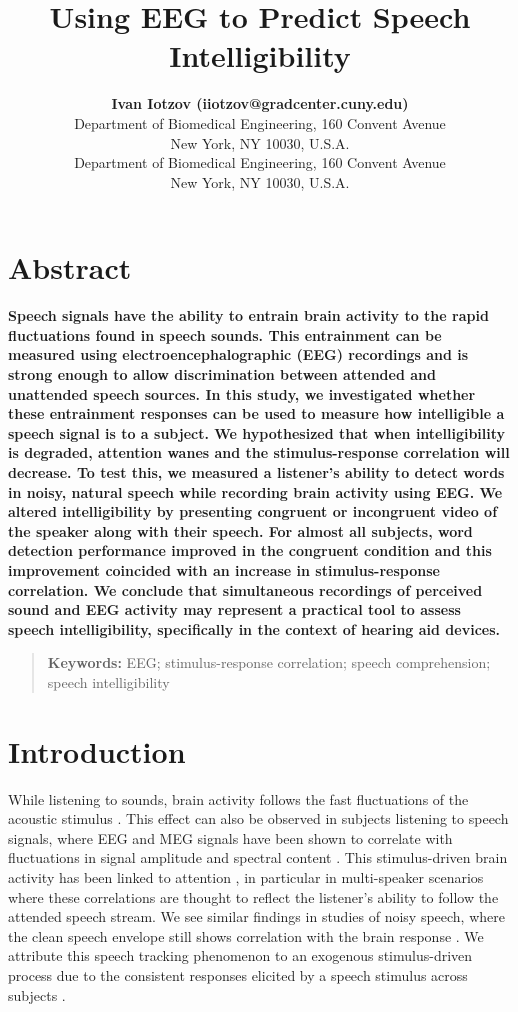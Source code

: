 \documentclass[10pt,letterpaper]{article}
\title{Using EEG to Predict Speech Intelligibility}
\author{{\large \bf Ivan Iotzov (iiotzov@gradcenter.cuny.edu)} \\
  Department of Biomedical Engineering, 160 Convent Avenue\\
New York, NY 10030, U.S.A.
  \AND {\large \bf Lucas C. Parra (parra@ccny.cuny.edu)} \\
  Department of Biomedical Engineering, 160 Convent Avenue\\
New York, NY 10030, U.S.A.}
\begin{document}
\maketitle


\section{Abstract}
{
\bf
Speech signals have the ability to entrain brain activity to the rapid 
fluctuations found in speech sounds. This entrainment can be measured 
using electroencephalographic (EEG) recordings and is strong enough to allow 
discrimination between attended and unattended speech sources. In this study,
we investigated whether these entrainment responses can be used to measure 
how intelligible a speech signal is to a subject. We hypothesized that when 
intelligibility is degraded, attention wanes and the stimulus-response 
correlation will decrease. To test this, we measured a listener's ability 
to detect words in noisy, natural speech while recording brain activity using 
EEG. We altered intelligibility by presenting congruent or incongruent video 
of the speaker along with their speech. For almost all subjects, word 
detection performance improved in the congruent condition and this improvement 
coincided with an increase in stimulus-response correlation. We conclude that 
simultaneous recordings of perceived sound and EEG activity may represent a 
practical tool to assess speech intelligibility, specifically in the context 
of hearing aid devices.
}

\begin{quote}
\small
\textbf{Keywords:} 
EEG; stimulus-response correlation; 
speech comprehension; speech intelligibility
\end{quote}

\section{Introduction}

While listening to sounds, brain activity follows the fast fluctuations of 
the acoustic stimulus \cite{Ding2014a,Haegens2018}. This effect can also
be observed in subjects listening to speech signals, 
where EEG and MEG signals have been shown to correlate 
with fluctuations in signal amplitude and spectral content 
\cite{Luo2007,Horton2014}. This stimulus-driven brain activity has been linked
to attention \cite{ZionGolumbic2013,OSullivan2015}, in particular in 
multi-speaker scenarios where these correlations are thought to reflect 
the listener's ability to follow the attended speech stream. We see similar 
findings in studies of noisy speech, where the clean speech envelope still 
shows correlation with the brain response \cite{Ding2013,Vanthornhout2017}.
We attribute this
speech tracking phenomenon to an exogenous stimulus-driven process due to the 
consistent responses elicited by a speech stimulus across subjects 
\cite{Ki2016,Cohen2017}. 
\end{document}
